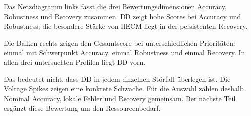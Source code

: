 \begin{sprechtext}

Das Netzdiagramm links fasst die drei Bewertungsdimensionen Accuracy, Robustness und Recovery zusammen. DD zeigt hohe Scores bei Accuracy und Robustness; die besondere Stärke von HECM liegt in der persistenten Recovery.

Die Balken rechts zeigen den Gesamtscore bei unterschiedlichen Prioritäten: einmal mit Schwerpunkt Accuracy, einmal Robustness und einmal Recovery. In allen drei untersuchten Profilen liegt DD vorn.

Das bedeutet nicht, dass DD in jedem einzelnen Störfall überlegen ist. Die Voltage Spikes zeigen eine konkrete Schwäche. Für die Auswahl zählen deshalb Nominal Accuracy, lokale Fehler und Recovery gemeinsam. Der nächste Teil ergänzt diese Bewertung um den Ressourcenbedarf.

\end{sprechtext}
